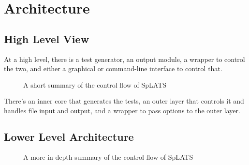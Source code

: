 \chapter{Architecture}

\section{High Level View}

  At a high level, there is a test generator, an output module, a wrapper to control the two, and either a graphical or command-line interface to control that.
\begin{center}
\begin{figure}
\caption{A short summary of the control flow of SpLATS}
\end{figure}
\end{center}

    There's an inner core that generates the tests, an outer layer that controls it and handles file input and output, and a wrapper to pass options to the outer layer.
    
\section{Lower Level Architecture}

  \begin{center}
  \begin{figure}
%  
  \caption{A more in-depth summary of the control flow of SpLATS}
  \end{figure}
  \end{center}
  
